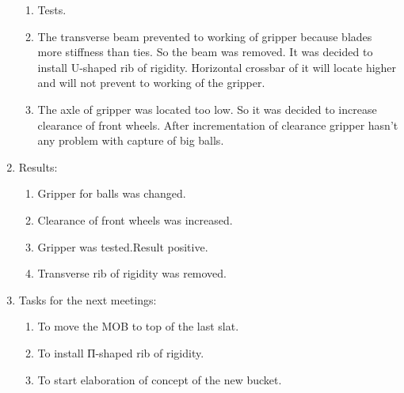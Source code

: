 \begin{enumerate}
\begin{enumerate}
		\item Tests.
		
		\item The transverse beam prevented to working of gripper because blades more stiffness than ties. So the beam was removed. It was decided to install U-shaped rib of rigidity. Horizontal crossbar of it will locate higher and will not prevent to working of the gripper.
		
		\item The axle of gripper was located too low. So it was decided to increase clearance of front wheels. After incrementation of clearance gripper hasn't any problem with capture of big balls.
		
		
	\end{enumerate}
	
	\item Results: 
	\begin{enumerate}
		\item Gripper for balls was changed.
		
		\item Clearance of front wheels was increased.
		
		\item Gripper was tested.Result positive.
		
		\item Transverse rib of rigidity was removed.
		
	\end{enumerate}
	
	\item Tasks for the next meetings:
	\begin{enumerate}
		\item To move the MOB to top of the last slat.
		
		\item To install П-shaped rib of rigidity.
		
		\item To start elaboration of concept of the new bucket.
		
	\end{enumerate}     
\end{enumerate}
\fillpage